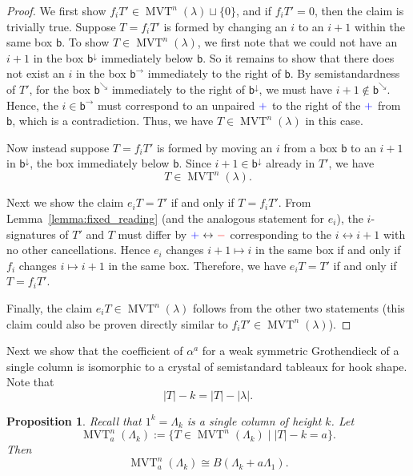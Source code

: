 \documentclass[10pt]{amsart}
\newtheorem{prop}[theo]{Proposition}
\theoremstyle{definition}
\newcommand{\iso}{\cong}
\newcommand{\bbb}{\mathsf{b}}
\newcommand{\abs}[1]{\lvert #1 \rvert}
\DeclareMathOperator{\mvt}{MVT} %
\newcommand{\bplus}{{\color{blue}+}}
\newcommand{\bminus}{{\color{red}-}}
\begin{document}
\begin{proof}
We first show $f_i T' \in \mvt^n(\lambda) \sqcup \{0\}$, and if $f_i T' = 0$, then the claim is trivially true.
Suppose $T = f_i T'$ is formed by changing an $i$ to an $i+1$ within the same box $\bbb$. To show $T \in \mvt^n(\lambda)$, we first note that we could not have an $i+1$ in the box $\bbb^{\downarrow}$ immediately below $\bbb$. So it remains to show that there does not exist an $i$ in the box $\bbb^{\rightarrow}$ immediately to the right of $\bbb$. By semistandardness of $T'$, for the box $\bbb^{\searrow}$ immediately to the right of $\bbb^{\downarrow}$, we must have $i + 1 \notin \bbb^{\searrow}$. Hence, the $i \in \bbb^{\rightarrow}$ must correspond to an unpaired $\bplus$ to the right of the $\bplus$ from $\bbb$, which is a contradiction. Thus, we have $T \in \mvt^n(\lambda)$ in this case.

Now instead suppose $T = f_i T'$ is formed by moving an $i$ from a box $\bbb$ to an $i+1$ in $\bbb^{\downarrow}$, the box immediately below $\bbb$. Since $i+1 \in \bbb^{\downarrow}$ already in $T'$, we have 
\[
T \in \mvt^n(\lambda).
\]

Next we show the claim $e_i T = T'$ if and only if $T = f_i T'$.
From Lemma~\ref{lemma:fixed_reading} (and the analogous statement for $e_i$), the $i$-signatures of $T'$ and $T$ must differ by $\bplus \leftrightarrow \bminus$ corresponding to the $i \leftrightarrow i+1$ with no other cancellations. Hence $e_i$ changes $i+1 \mapsto i$ in the same box if and only if $f_i$ changes $i \mapsto i+1$ in the same box. Therefore, we have $e_i T = T'$ if and only if $T = f_i T'$.

Finally, the claim $e_i T \in \mvt^n(\lambda)$ follows from the other two statements (this claim could also be proven directly similar to $f_i T' \in \mvt^n(\lambda)$).
\end{proof}

Next we show that the coefficient of $\alpha^a$ for a weak symmetric Grothendieck of a single column is isomorphic to a crystal of semistandard tableaux for hook shape.
Note that 
\[
\abs{T} - k = \abs{T} - \abs{\lambda}.
\]

\begin{prop}
\label{prop:column_isomorphism}
Recall that $1^k = \Lambda_k$ is a single column of height $k$.
Let
\[
\mvt^n_a(\Lambda_k) := \{ T \in \mvt^n(\Lambda_k) \mid \abs{T} - k = a \}.
\]
Then
\[
\mvt^n_a(\Lambda_k) \iso B(\Lambda_k + a\Lambda_1).
\]
\end{prop}
\end{document}
